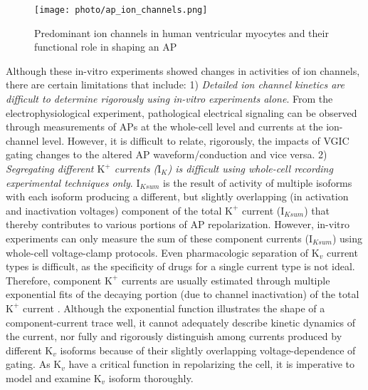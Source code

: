 \documentclass[journal]{IEEEtran}
\begin{document}
\begin{figure}
    \label{fig2}
    \centering
    \texttt{[image: photo/ap\_ion\_channels.png]}
    \caption{Predominant ion channels in human ventricular myocytes and their functional role in shaping an AP}
    \label{fig:my_label}
\end{figure}

Although these in-vitro experiments showed changes in activities of ion channels, there are certain limitations that include: 1) \textit{Detailed ion channel kinetics are difficult to determine rigorously using in-vitro experiments alone}. From the electrophysiological experiment, pathological electrical signaling can be observed through measurements of APs at the whole-cell level and currents at the ion-channel level. However, it is difficult to relate, rigorously, the impacts of VGIC gating changes to the altered AP waveform/conduction and vice versa. 2) \textit{Segregating different $\text{K}^{+}$ currents ($\text{I}_{K}$) is difficult using whole-cell recording experimental techniques only}. $\text{I}_{Ksum}$ is the result of activity of multiple isoforms with each isoform producing a different, but slightly overlapping (in activation and inactivation voltages) component of the total $\text{K}^{+}$ current ($\text{I}_{Ksum}$) \cite{du2017} that thereby contributes to various portions of AP repolarization. However, in-vitro experiments can only measure the sum of these component currents ($\text{I}_{Ksum}$) using whole-cell voltage-clamp protocols. Even pharmacologic separation of $\text{K}_{v}$ current types is difficult, as the specificity of drugs for a single current type is not ideal. Therefore, component $\text{K}^{+}$ currents are usually estimated through multiple exponential fits of the decaying portion (due to channel inactivation) of the total $\text{K}^{+}$ current \cite{brunet2004heterogeneous}. Although the exponential function illustrates the shape of a component-current trace well, it cannot adequately describe kinetic dynamics of the current, nor fully and rigorously distinguish among currents produced by different $\text{K}_{v}$ isoforms because of their slightly overlapping voltage-dependence of gating. As $\text{K}_{v}$ have a critical function in repolarizing the cell, it is imperative to model and examine $\text{K}_{v}$ isoform thoroughly.
\end{document}
